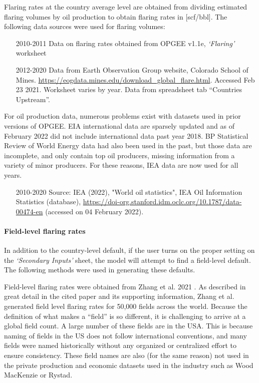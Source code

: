 \documentclass[11pt]{report}
\newcommand{\sheet}[1]{\textit{`{#1}'}}
\begin{document}
Flaring rates at the country average level are obtained from dividing estimated flaring volumes by oil production to obtain flaring rates in [scf/bbl]. The following data sources were used for flaring volumes:
\begin{itemize}
\item[2010-2011] Data on flaring rates obtained from OPGEE v1.1e, \sheet{Flaring} worksheet
\item[2012-2020] Data from Earth Observation Group website, Colorado School of Mines. \url{https://eogdata.mines.edu/download_global_flare.html}. Accessed Feb 23 2021. Worksheet varies by year. Data from spreadsheet tab ``Countries Upstream''.
\end{itemize}
For oil production data, numerous problems exist with datasets used in prior versions of OPGEE. EIA international data are sparsely updated and as of February 2022 did not include international data past year 2018. BP Statistical Review of World Energy data had also been used in the past, but those data are incomplete, and only contain top oil producers, missing information from a variety of minor producers. For these reasons, IEA data are now used for all years.
\begin{itemize}
\item[2010-2020] Source: IEA (2022), "World oil statistics", IEA Oil Information Statistics (database), \url{https://doi-org.stanford.idm.oclc.org/10.1787/data-00474-en} (accessed on 04 February 2022).
\end{itemize}


\paragraph{Field-level flaring rates}

In addition to the country-level default, if the user turns on the proper setting on the \sheet{Secondary Inputs} sheet, the model will attempt to find a field-level default. The following methods were used in generating these defaults.

Field-level flaring rates were obtained from Zhang et al. 2021 \cite{Zhang2021}. As described in great detail in the cited paper and its supporting information, Zhang et al. generated field level flaring rates for 50,000 fields across the world. Because the definition of what makes a ``field'' is so different, it is challenging to arrive at a global field count. A large number of these fields are in the USA. This is because naming of fields in the US does not follow international conventions, and many fields were named historically without any organized or centralized effort to ensure consistency. These field names are also (for the same reason) not used in the private production and economic datasets used in the industry such as Wood MacKenzie or Rystad. 
\end{document}
